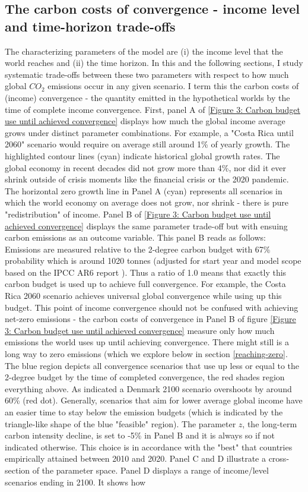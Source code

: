 \documentclass{article}
\begin{document}
\FloatBarrier


\subsection{The carbon costs of convergence - income level and time-horizon trade-offs}

The characterizing parameters of the model are (i) the income level that the world reaches and (ii) the time horizon. In this and the following sections, I study systematic trade-offs between these two parameters with respect to how much global \(CO_2\) emissions occur in any given scenario. I term this the carbon costs of (income) convergence - the quantity emitted in the hypothetical worlds by the time of complete income convergence.  First, panel A of \ref{Figure 3: Carbon budget use until achieved convergence} displays how much the global income average grows under distinct parameter combinations. For example, a "Costa Rica until 2060" scenario would require on average still around 1\% of yearly growth. The highlighted contour lines (cyan) indicate historical global growth rates. The global economy in recent decades did not grow more than 4\%, nor did it ever shrink outside of crisis moments like the financial crisis or the 2020 pandemic. The horizontal zero growth line in Panel A (cyan) represents all scenarios in which the world economy on average does not grow, nor shrink - there is pure "redistribution" of income. Panel B of \ref{Figure 3: Carbon budget use until achieved convergence} displays the same parameter trade-off but with ensuing carbon emissions as an outcome variable. This panel B reads as follows: Emissions are measured relative to the 2-degree carbon budget with 67\% probability which is around 1020 tonnes (adjusted for start year and model scope based on the IPCC AR6 report \parencite{mukherji2023climate}). Thus a ratio of 1.0 means that exactly this carbon budget is used up to achieve full convergence. For example, the Costa Rica 2060 scenario achieves universal global convergence while using up this budget. This point of income convergence should not be confused with achieving net-zero emissions - the carbon costs of convergence in Panel B of figure \ref{Figure 3: Carbon budget use until achieved convergence} measure only how much emissions the world uses up until achieving convergence. There might still is a long way to zero emissions (which we explore below in section \ref{reaching-zero}. The blue region depicts all convergence scenarios that use up less or equal to the 2-degree budget by the time of completed convergence, the red shades region everything above. As indicated a Denmark 2100 scenario overshoots by around 60\% (red dot). Generally, scenarios that aim for lower average global income have an easier time to stay below the emission budgets (which is indicated by the triangle-like shape of the blue "feasible" region). The parameter \(z\), the long-term carbon intensity decline, is set to -5\% in Panel B and it is always so if not indicated otherwise. This choice is in accordance with the "best" that countries empirically attained between 2010 and 2020. Panel C and D illustrate a cross-section of the parameter space. Panel D displays a range of income/level scenarios ending in 2100. It shows how 
\end{document}
